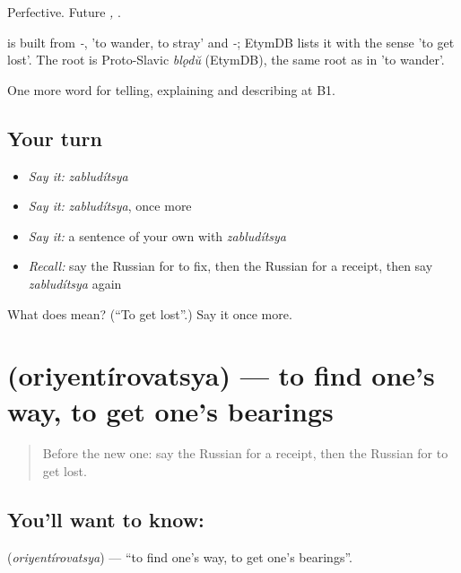 Perfective. Future \emph{, }.

\begin{cousinweb}
\emph{} is built from \emph{-}, \emph{} 'to wander, to stray' and \emph{-}; EtymDB lists it with the sense 'to get lost'. The root is Proto-Slavic \emph{blǫdŭ} (EtymDB), the same root as in \emph{} 'to wander'.
\end{cousinweb}

\begin{grammarlens}[title={What you've built}]
One more word for telling, explaining and describing at B1.
\end{grammarlens}

\subsection*{Your turn}
\begin{itemize}
\raggedright
  \item \emph{Say it:} \emph{zabludítsya}
  \item \emph{Say it:} \emph{zabludítsya}, once more
  \item \emph{Say it:} a sentence of your own with \emph{zabludítsya}
  \item \emph{Recall:} say the Russian for to fix, then the Russian for a receipt, then say \emph{zabludítsya} again
\end{itemize}

\begin{tcolorbox}[breakable,colback=teal!4,colframe=teal!35!black,title={Before you move on}]
What does  mean? (\textquotedblleft{}To get lost\textquotedblright{}.) Say it once more.
\end{tcolorbox}
\section[\texorpdfstring{\ru{ориентироваться} (oriyentírovatsya)}{ориентироваться (oriyentírovatsya)}]{ (oriyentírovatsya) — to find one's way, to get one's bearings}

\label{lesson:RU-C437-oriyentirovatsya}



\begin{quote}
Before the new one: say the Russian for a receipt, then the Russian for to get lost.
\end{quote}

\subsection*{You'll want to know: }
\textbf{} (\emph{oriyentírovatsya}) — \textquotedblleft{}to find one's way, to get one's bearings\textquotedblright{}.

